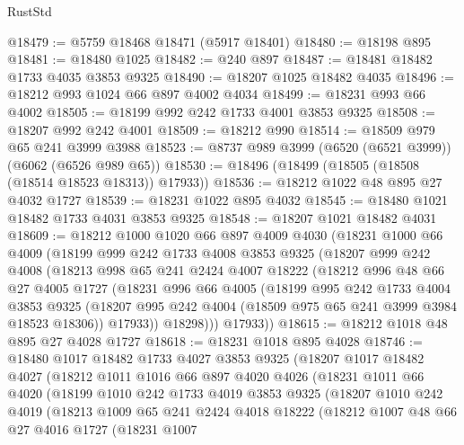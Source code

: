\begin{lexlean}{RustStd}
\begin{coremodule}
@18479 := @5759 @18468 @18471 (@5917 @18401)
@18480 := @18198 @895
@18481 := @18480 @1025
@18482 := @240 @897
@18487 := @18481 @18482 @1733 @4035 @3853 @9325
@18490 := @18207 @1025 @18482 @4035
@18496 := @18212 @993 @1024 @66 @897 @4002 @4034
@18499 := @18231 @993 @66 @4002
@18505 := @18199 @992 @242 @1733 @4001 @3853 @9325
@18508 := @18207 @992 @242 @4001
@18509 := @18212 @990
@18514 := @18509 @979 @65 @241 @3999 @3988
@18523 := @8737 @989 @3999 (@6520 (@6521 @3999)) (@6062 (@6526 @989 @65))
@18530 := @18496 (@18499 (@18505 (@18508 (@18514 @18523 @18313)) @17933))
@18536 := @18212 @1022 @48 @895 @27 @4032 @1727
@18539 := @18231 @1022 @895 @4032
@18545 := @18480 @1021 @18482 @1733 @4031 @3853 @9325
@18548 := @18207 @1021 @18482 @4031
@18609 := @18212
    @1000
    @1020
    @66
    @897
    @4009
    @4030
    (@18231
      @1000
      @66
      @4009
      (@18199
        @999
        @242
        @1733
        @4008
        @3853
        @9325
        (@18207
          @999
          @242
          @4008
          (@18213
            @998
            @65
            @241
            @2424
            @4007
            @18222
            (@18212
              @996
              @48
              @66
              @27
              @4005
              @1727
              (@18231
                @996
                @66
                @4005
                (@18199
                  @995
                  @242
                  @1733
                  @4004
                  @3853
                  @9325
                  (@18207 @995 @242 @4004 (@18509 @975 @65 @241 @3999 @3984 @18523 @18306))
                  @17933))
              @18298)))
        @17933))
@18615 := @18212 @1018 @48 @895 @27 @4028 @1727
@18618 := @18231 @1018 @895 @4028
@18746 := @18480
    @1017
    @18482
    @1733
    @4027
    @3853
    @9325
    (@18207
      @1017
      @18482
      @4027
      (@18212
        @1011
        @1016
        @66
        @897
        @4020
        @4026
        (@18231
          @1011
          @66
          @4020
          (@18199
            @1010
            @242
            @1733
            @4019
            @3853
            @9325
            (@18207
              @1010
              @242
              @4019
              (@18213
                @1009
                @65
                @241
                @2424
                @4018
                @18222
                (@18212
                  @1007
                  @48
                  @66
                  @27
                  @4016
                  @1727
                  (@18231
                    @1007

\end{coremodule}
\end{lexlean}
